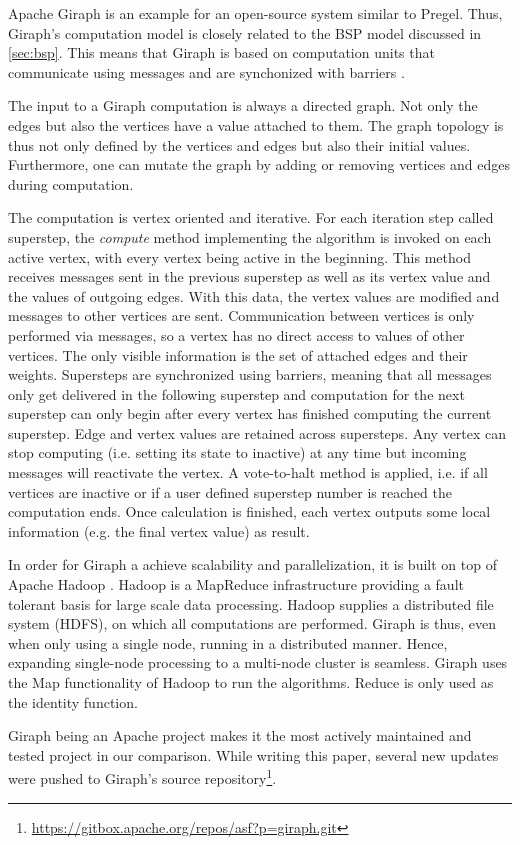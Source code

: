 Apache Giraph is an example for an open-source system similar to Pregel.
Thus, Giraph's computation model is closely related to the BSP model discussed in \autoref{sec:bsp}. 
This means that Giraph is based on computation units that communicate using messages and are synchonized with barriers \cite{Giraph}.

The input to a Giraph computation is always a directed graph. Not only the edges but also the vertices have a value attached to them. The graph topology is thus not only defined by the vertices and edges but also their initial values.
Furthermore, one can mutate the graph by adding or removing vertices and edges during computation.

The computation is vertex oriented and iterative.
For each iteration step called superstep, the \emph{compute} method implementing the algorithm is invoked on each active vertex, with every vertex being active in the beginning.
This method receives messages sent in the previous superstep as well as its vertex value and the values of outgoing edges.
With this data, the vertex values are modified and messages to other vertices are sent.
Communication between vertices is only performed via messages, so a vertex has no direct access to values of other vertices. The only visible information is the set of attached edges and their weights.
Supersteps are synchronized using barriers, meaning that all messages only get delivered in the following superstep and computation for the next superstep can only begin after every vertex has finished computing the current superstep.
Edge and vertex values are retained across supersteps.
Any vertex can stop computing (i.e. setting its state to inactive) at any time but incoming messages will reactivate the vertex.
A vote-to-halt method is applied, i.e. if all vertices are inactive or if a user defined superstep number is reached the computation ends.
Once calculation is finished, each vertex outputs some local information (e.g. the final vertex value) as result.

In order for Giraph a achieve scalability and parallelization, it is built on top of Apache Hadoop \cite{Giraph}.
Hadoop is a MapReduce infrastructure providing a fault tolerant basis for large scale data processing.
Hadoop supplies a distributed file system (HDFS), on which all computations are performed.
Giraph is thus, even when only using a single node, running in a distributed manner.
Hence, expanding single-node processing to a multi-node cluster is seamless.
Giraph uses the Map functionality of Hadoop to run the algorithms. Reduce is only used as the identity function.

Giraph being an Apache project makes it the most actively maintained and tested project in our comparison. While writing this paper, several new updates were pushed to Giraph's source repository\footnote{\url{https://gitbox.apache.org/repos/asf?p=giraph.git}}.
